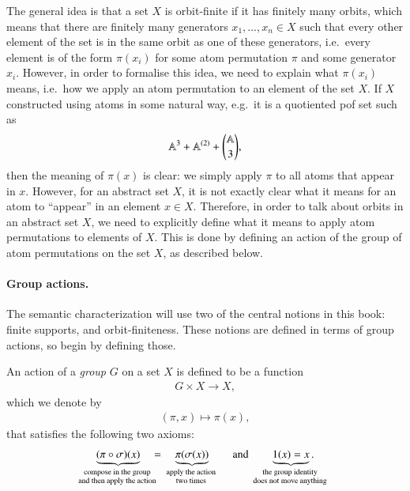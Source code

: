 The general idea is that a set $X$ is orbit-finite if it has finitely many orbits, which means that there are finitely many generators  $x_1,\ldots,x_n \in X$ such that every other element of the set is in the same orbit as one of these generators, i.e.~every element is of the form $\pi(x_i)$ for some atom permutation $\pi$ and some generator $x_i$.  However, in order to formalise this idea, we need to explain what $\pi(x_i)$ means, i.e.~how we apply an atom permutation to an element of the set $X$. If $X$ constructed using atoms in some natural way, e.g.~it is a quotiented pof set such as \begin{align*}
\mathbb A^3 + \mathbb A^{(2)} + {\mathbb A \choose 3},
\end{align*}
then the meaning of $\pi(x)$ is clear: we simply apply $\pi$ to all atoms that appear in $x$. However, for an abstract set $X$, it is not exactly clear what it means for an atom to ``appear'' in an element $x \in X$. Therefore, in order to talk about orbits in an abstract set $X$, we need to explicitly define what it means to apply atom permutations to elements of $X$. This is done by defining an action of the group of atom permutations on the set $X$, as described below. 


\paragraph*{Group actions.}
The semantic characterization will use two of the central notions in this book: finite supports, and orbit-finiteness. These notions are defined in terms of group actions, so begin by defining those. 





\begin{definition}\label{def:group-action}
    An action of a \emph{group} $G$ on a set $X$ is defined to be a function 
    \begin{align*}
     G \times X \to X,
    \end{align*}
    which we denote by
    \begin{align*}
    (\pi,x) \mapsto \pi(x),
    \end{align*}
    that satisfies the following two axioms: 
    \begin{align*}
    \myunderbrace{(\pi \circ \sigma)(x)}{compose in the group\\ and then apply the action} \quad = \quad \myunderbrace{\pi(\sigma(x))}{apply the action \\ two times} 
    \qquad \text{and} \qquad 
    \myunderbrace{1(x)=x}{the group identity\\ does not move anything}.
    \end{align*}
\end{definition}

